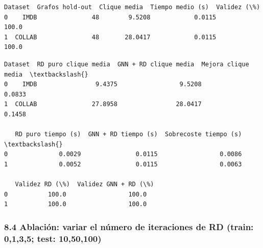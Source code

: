 \documentclass[11pt]{article}
\begin{document}
    
    \begin{Verbatim}[commandchars=\\\{\}]
  Dataset  Grafos hold-out  Clique media  Tiempo medio (s)  Validez (\%)
0    IMDB               48        9.5208            0.0115        100.0
1  COLLAB               48       28.0417            0.0115        100.0
    \end{Verbatim}

    
    
    \begin{Verbatim}[commandchars=\\\{\}]
  Dataset  RD puro clique media  GNN + RD clique media  Mejora clique media  \textbackslash{}
0    IMDB                9.4375                 9.5208               0.0833   
1  COLLAB               27.8958                28.0417               0.1458   

   RD puro tiempo (s)  GNN + RD tiempo (s)  Sobrecoste tiempo (s)  \textbackslash{}
0              0.0029               0.0115                 0.0086   
1              0.0052               0.0115                 0.0063   

   Validez RD (\%)  Validez GNN + RD (\%)  
0           100.0                 100.0  
1           100.0                 100.0  
    \end{Verbatim}

    
    \subsubsection{8.4 Ablación: variar el número de iteraciones de RD
(train: 0,1,3,5; test:
10,50,100)}\label{ablaciuxf3n-variar-el-nuxfamero-de-iteraciones-de-rd-train-0135-test-1050100}
\end{document}
